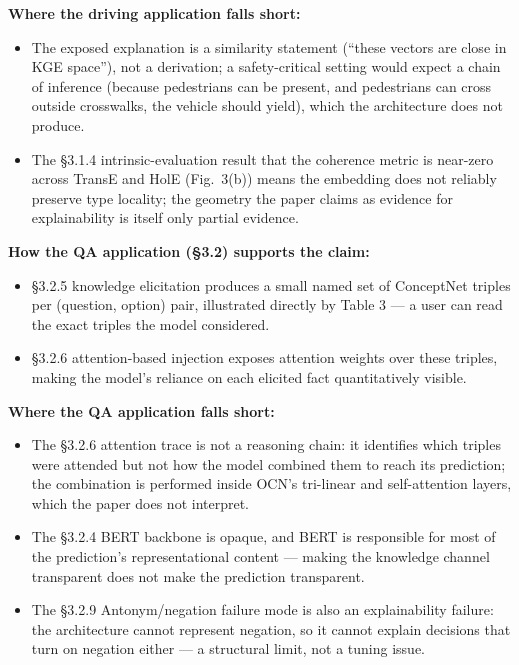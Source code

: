 \documentclass[11pt, a4paper]{article}
\begin{document}
\textbf{Where the driving application falls short:}
\begin{itemize}
  \item The exposed explanation is a similarity statement (``these vectors are close in KGE space''), not a derivation; a safety-critical setting would expect a chain of inference (because pedestrians can be present, and pedestrians can cross outside crosswalks, the vehicle should yield), which the architecture does not produce.
  \item The §3.1.4 intrinsic-evaluation result that the coherence metric is near-zero across TransE and HolE (Fig.\ 3(b)) means the embedding does not reliably preserve type locality; the geometry the paper claims as evidence for explainability is itself only partial evidence.
\end{itemize}

\textbf{How the QA application (§3.2) supports the claim:}
\begin{itemize}
  \item §3.2.5 knowledge elicitation produces a small named set of ConceptNet triples per (question, option) pair, illustrated directly by Table 3 — a user can read the exact triples the model considered.
  \item §3.2.6 attention-based injection exposes attention weights over these triples, making the model's reliance on each elicited fact quantitatively visible.
\end{itemize}

\textbf{Where the QA application falls short:}
\begin{itemize}
  \item The §3.2.6 attention trace is not a reasoning chain: it identifies which triples were attended but not how the model combined them to reach its prediction; the combination is performed inside OCN's tri-linear and self-attention layers, which the paper does not interpret.
  \item The §3.2.4 BERT backbone is opaque, and BERT is responsible for most of the prediction's representational content — making the knowledge channel transparent does not make the prediction transparent.
  \item The §3.2.9 Antonym/negation failure mode is also an explainability failure: the architecture cannot represent negation, so it cannot explain decisions that turn on negation either — a structural limit, not a tuning issue.
\end{itemize}
\end{document}

